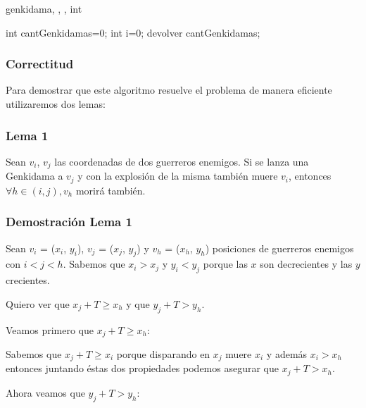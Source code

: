 	\begin{algoritmo}{genkidama}{, , , }{int}

		int cantGenkidamas=0;
  		int i=0;
  		devolver cantGenkidamas; \;
	\end{algoritmo} \;
	
	    \subsubsection*{Correctitud}

    	
    	Para demostrar que este algoritmo resuelve el problema de manera eficiente utilizaremos dos lemas:
    		\subsubsection*{Lema 1}

    			Sean $v_{i}$, $v_{j}$ las coordenadas de dos guerreros enemigos. Si se lanza una Genkidama a $v_{j}$ y con la explosión de la misma también muere $v_{i}$, entonces $ \forall h \in (i,j), v_{h}$ morirá también. 

    		\subsubsection*{Demostración Lema 1}

    			Sean $v_{i}$ = ($x_{i}$, $y_{i}$), $v_{j}$ = ($x_{j}$, $y_{j}$) y $v_{h}$ = ($x_{h}$, $y_{h}$) posiciones de guerreros enemigos con $i < j < h$.
    			Sabemos que $x_{i} > x_{j}$ y $y_{i} < y_{j}$ porque las $x$ son decrecientes y las $y$ crecientes.

    			Quiero ver que $x_{j} + T \geqslant x_{h}$ y que $y_{j} + T > y_{h}$.

    			Veamos primero que $x_{j} + T \geqslant x_{h}$:

    			Sabemos que $x_{j} + T \geqslant x_{i}$ porque disparando en $x_{j}$ muere $x_{i}$ y además $x_{i} > x_{h}$ entonces juntando éstas dos propiedades podemos asegurar que $x_{j} + T > x_{h}$.

    			Ahora veamos que $y_{j} + T > y_{h}$:

